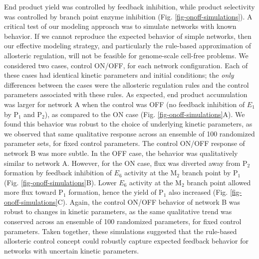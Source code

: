 \documentclass[12pt]{article}
\begin{document}
End product yield was controlled by feedback inhibition, while product selectivity was controlled by branch point enzyme inhibition (Fig. \ref{fig-onoff-simulations}). 
A critical test of our modeling approach was to simulate networks with known behavior. 
If we cannot reproduce the expected behavior of simple networks, then our effective modeling strategy, and particularly the rule-based approximation of allosteric regulation, will not be feasible for genome-scale cell-free problems. We considered two cases, control ON/OFF, for each network configuration. 
Each of these cases had identical kinetic parameters and initial conditions; the \textit{only} differences between the cases were the allosteric regulation rules and the control parameters associated with these rules. 
As expected, end product accumulation was larger for network A when the control was OFF (no feedback inhibition of $E_{1}$ by P$_{1}$ and P$_{2}$),
as compared to the ON case (Fig. \ref{fig-onoff-simulations}A). 
We found this behavior was robust to the choice of underlying kinetic parameters, as we observed that same qualitative response across an ensemble of 100 randomized parameter sets, for fixed control parameters. 
The control ON/OFF response of network B was more subtle. 
In the OFF case, the behavior was qualitatively similar to network A. 
However, for the ON case, flux was diverted away from P$_{2}$ formation by feedback inhibition of $E_{6}$ activity at the M$_{2}$ branch point by P$_{1}$ (Fig. \ref{fig-onoff-simulations}B). 
Lower $E_{6}$ activity at the M$_{2}$ branch point allowed more flux toward P$_{1}$ formation, hence the yield of P$_{1}$ also increased (Fig. \ref{fig-onoff-simulations}C). 
Again, the control ON/OFF behavior of network B was robust to changes in kinetic parameters, as the same qualitative trend was conserved across an ensemble of 100 randomized parameters, for fixed control parameters. 
Taken together, these simulations suggested that the rule-based allosteric control concept could robustly capture expected feedback behavior for networks with uncertain kinetic parameters.
\end{document}
